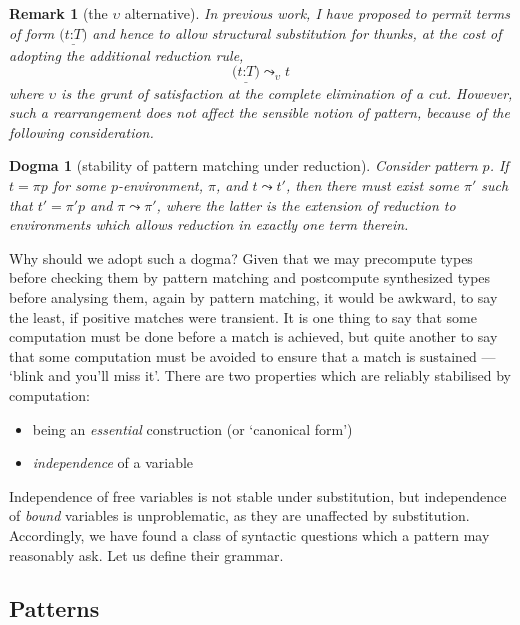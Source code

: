 \documentclass{jfp1}
\newtheorem{remark}[theorem]{Remark}
\newtheorem{dogma}[theorem]{Dogma}
\newcommand{\Pa}[1]{\texttt{(}#1\texttt{)}}
\newcommand{\hb}{\texttt{:}}
\newcommand{\ra}[2]{\Pa{#1 \hb #2}}
\newcommand{\Ne}{\underline}
\begin{document}
\begin{remark}[the $\upsilon$ alternative]
  In previous work, I have proposed to permit terms of form $\Ne{\ra
    tT}$ and hence to allow structural substitution for thunks, at the
  cost of adopting the additional reduction rule,
  \[
    \Ne{\ra tT} \leadsto_\upsilon t
  \]
  where $\upsilon$ is the grunt of satisfaction at the complete
  elimination of a cut. However, such a rearrangement does not
  affect the sensible notion of pattern, because of the following
  consideration.
\end{remark}

\begin{dogma}[stability of pattern matching under reduction]
  Consider pattern $p$. If $t=\pi p$ for some $p$-environment, $\pi$,
  and $t\leadsto t'$, then there must exist some $\pi'$ such that
  $t'=\pi' p$ and $\pi\leadsto\pi'$, where the latter is the
  extension of reduction to environments which allows reduction in exactly
  one term therein.
\end{dogma}

Why should we adopt such a dogma? Given that we may precompute types
before checking them by pattern matching and postcompute synthesized
types before analysing them, again by pattern matching, it would be
awkward, to say the least, if positive matches were transient. It is
one thing to say that some computation must be done before a match is
achieved, but quite another to say that some computation must be
avoided to ensure that a match is sustained --- `blink and you'll
miss it'. There are two properties which are reliably stabilised
by computation:
\begin{itemize}
\item being an \emph{essential} construction (or `canonical form')
\item \emph{independence} of a variable
\end{itemize}

Independence of free variables is not stable under substitution,
but independence of \emph{bound} variables is unproblematic, as they
are unaffected by substitution. Accordingly, we have found a class
of syntactic questions which a pattern may reasonably ask. Let us
define their grammar.


\subsection{Patterns}
\end{document}
